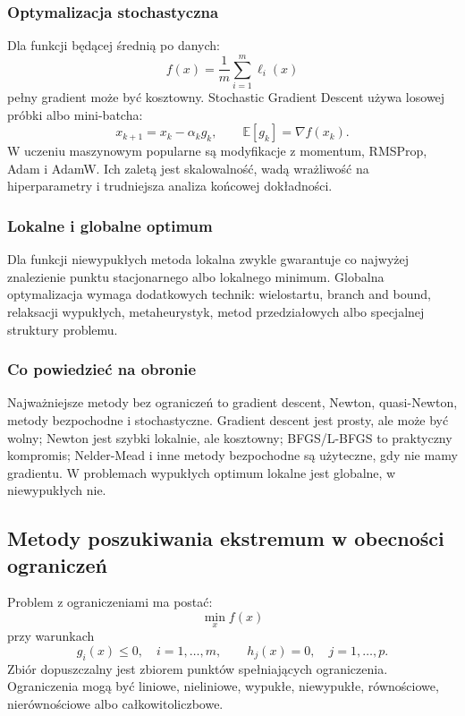 \subsubsection{Optymalizacja stochastyczna}

Dla funkcji będącej średnią po danych:
\[
f(x)=\frac{1}{m}\sum_{i=1}^{m}\ell_i(x)
\]
pełny gradient może być kosztowny. Stochastic Gradient Descent używa losowej próbki albo mini-batcha:
\[
x_{k+1}=x_k-\alpha_k g_k,\qquad \mathbb{E}[g_k]=\nabla f(x_k).
\]
W uczeniu maszynowym popularne są modyfikacje z momentum, RMSProp, Adam i AdamW. Ich zaletą jest skalowalność, wadą wrażliwość na hiperparametry i trudniejsza analiza końcowej dokładności.

\subsubsection{Lokalne i globalne optimum}

Dla funkcji niewypukłych metoda lokalna zwykle gwarantuje co najwyżej znalezienie punktu stacjonarnego albo lokalnego minimum. Globalna optymalizacja wymaga dodatkowych technik: wielostartu, branch and bound, relaksacji wypukłych, metaheurystyk, metod przedziałowych albo specjalnej struktury problemu.

\subsubsection{Co powiedzieć na obronie}

Najważniejsze metody bez ograniczeń to gradient descent, Newton, quasi-Newton, metody bezpochodne i stochastyczne. Gradient descent jest prosty, ale może być wolny; Newton jest szybki lokalnie, ale kosztowny; BFGS/L-BFGS to praktyczny kompromis; Nelder-Mead i inne metody bezpochodne są użyteczne, gdy nie mamy gradientu. W problemach wypukłych optimum lokalne jest globalne, w niewypukłych nie.

\subsection{Metody poszukiwania ekstremum w obecności ograniczeń}

Problem z ograniczeniami ma postać:
\[
\min_x f(x)
\]
przy warunkach
\[
g_i(x)\le 0,\quad i=1,\dots,m,\qquad h_j(x)=0,\quad j=1,\dots,p.
\]
Zbiór dopuszczalny jest zbiorem punktów spełniających ograniczenia. Ograniczenia mogą być liniowe, nieliniowe, wypukłe, niewypukłe, równościowe, nierównościowe albo całkowitoliczbowe.

